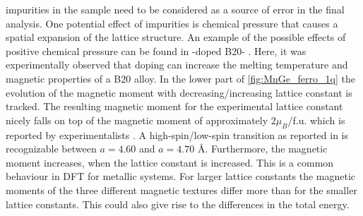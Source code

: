 \documentclass[graybox]{svmult}
\begin{document}
impurities in the sample need to be considered as a source of error in the
final analysis. One potential
effect of impurities is chemical pressure that causes a spatial expansion of the
lattice structure.
An example of the possible effects of positive chemical pressure
can be found in -doped B20- \cite{stolt_chemical_2018}. 
Here, it was experimentally observed
that doping can increase the melting temperature and magnetic properties of a B20 alloy.
In the lower part of \cref{fig:MnGe_ferro_1q} the evolution of the magnetic moment
with decreasing/increasing lattice constant is tracked.
The resulting magnetic moment for the experimental lattice constant nicely falls 
on top of the magnetic moment of approximately $2 \mu_{B}$/f.u. 
which is reported by experimentalists \cite{yaouanc_magnetic_2017}.
A high-spin/low-spin transition as reported in \cite{rosler_ab_2012}
is recognizable between $a=4.60$ and $a=4.70$ \AA.
Furthermore, the magnetic moment increases, when the lattice constant is increased.
This is a common behaviour in DFT for metallic systems.
For larger lattice constants the magnetic moments of the three different
magnetic textures differ more than for the smaller lattice constants.
This could also give rise to the differences in the total energy.
\end{document}
